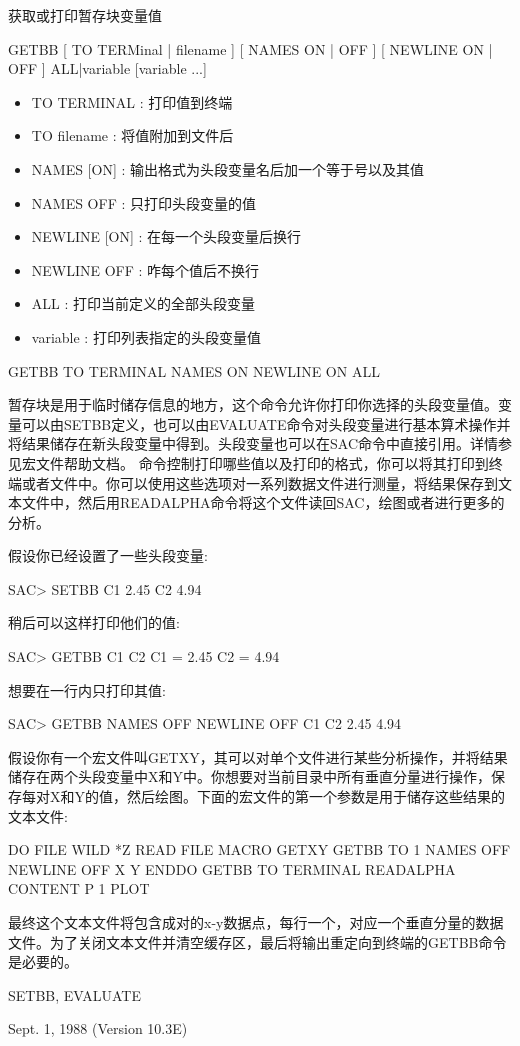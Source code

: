 \label{cmd:getbb}

获取或打印暂存块变量值

GETBB [ TO TERMinal | filename ] [ NAMES ON | OFF ] [ NEWLINE ON | OFF ] ALL|variable [variable ...]

\begin{itemize}
\item TO TERMINAL : 打印值到终端
\item TO filename : 将值附加到文件后
\item NAMES [ON] : 输出格式为头段变量名后加一个等于号以及其值
\item NAMES OFF :  只打印头段变量的值 
\item NEWLINE [ON] : 在每一个头段变量后换行 
\item NEWLINE OFF : 咋每个值后不换行 
\item ALL :  打印当前定义的全部头段变量 
\item variable : 打印列表指定的头段变量值 
\end{itemize}

GETBB TO TERMINAL NAMES ON NEWLINE ON ALL

暂存块是用于临时储存信息的地方，这个命令允许你打印你选择的头段变量值。变量可以由SETBB定义，也可以由EVALUATE命令对头段变量进行基本算术操作并将结果储存在新头段变量中得到。头段变量也可以在SAC命令中直接引用。详情参见宏文件帮助文档。
命令控制打印哪些值以及打印的格式，你可以将其打印到终端或者文件中。你可以使用这些选项对一系列数据文件进行测量，将结果保存到文本文件中，然后用READALPHA命令将这个文件读回SAC，绘图或者进行更多的分析。

假设你已经设置了一些头段变量:
\begin{SACCode}
SAC> SETBB C1 2.45 C2 4.94
\end{SACCode}
稍后可以这样打印他们的值:
\begin{SACCode}
SAC> GETBB C1 C2
 C1 = 2.45
 C2 = 4.94
\end{SACCode}
想要在一行内只打印其值:
\begin{SACCode}
SAC> GETBB NAMES OFF NEWLINE OFF C1 C2
 2.45 4.94
\end{SACCode}
假设你有一个宏文件叫GETXY，其可以对单个文件进行某些分析操作，并将结果储存在两个头段变量中X和Y中。你想要对当前目录中所有垂直分量进行操作，保存每对X和Y的值，然后绘图。下面的宏文件的第一个参数是用于储存这些结果的文本文件:
\begin{SACCode}
DO FILE WILD *Z
  READ FILE
  MACRO GETXY
  GETBB TO 1 NAMES OFF NEWLINE OFF X Y
ENDDO
GETBB TO TERMINAL
READALPHA CONTENT P 1
PLOT
\end{SACCode}
最终这个文本文件将包含成对的x-y数据点，每行一个，对应一个垂直分量的数据文件。为了关闭文本文件并清空缓存区，最后将输出重定向到终端的GETBB命令是必要的。

SETBB, EVALUATE

Sept. 1, 1988 (Version 10.3E)
